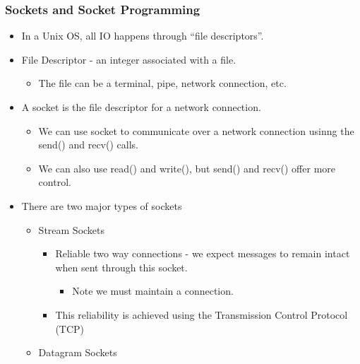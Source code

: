 \documentclass[]{article}
\providecommand{\tightlist}{%
  \setlength{\itemsep}{0pt}\setlength{\parskip}{0pt}}
\begin{document}
\hypertarget{sockets-and-socket-programming}{%
\subsubsection{Sockets and Socket
Programming}\label{sockets-and-socket-programming}}

\begin{itemize}
\tightlist
\item
  In a Unix OS, all IO happens through ``file descriptors''.
\item
  File Descriptor - an integer associated with a file.

  \begin{itemize}
  \tightlist
  \item
    The file can be a terminal, pipe, network connection, etc.
  \end{itemize}
\item
  A socket is the file descriptor for a network connection.

  \begin{itemize}
  \tightlist
  \item
    We can use socket to communicate over a network connection usinng
    the send() and recv() calls.
  \item
    We can also use read() and write(), but send() and recv() offer more
    control.
  \end{itemize}
\item
  There are two major types of sockets

  \begin{itemize}
  \tightlist
  \item
    Stream Sockets

    \begin{itemize}
    \tightlist
    \item
      Reliable two way connections - we expect messages to remain intact
      when sent through this socket.

      \begin{itemize}
      \tightlist
      \item
        Note we must maintain a connection.
      \end{itemize}
    \item
      This reliability is achieved using the Transmission Control
      Protocol (TCP)
    \end{itemize}
  \item
    Datagram Sockets


\end{itemize}
\end{itemize}
\end{document}
